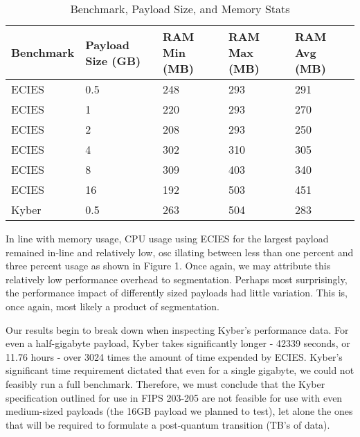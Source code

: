 \documentclass[a4paper]{article}
\begin{document}
  \begin{table}[htbp]
      \centering
      \caption{Benchmark, Payload Size, and Memory Stats}
      \label{tab:benchmark-payload-memory}
      \begin{tabular}{@{}lllll@{}}
          \toprule
          Benchmark & Payload Size (GB) & RAM Min (MB) & RAM Max (MB) & RAM Avg (MB) \\ \midrule
          ECIES     & 0.5               & 248           & 293           & 291           \\
          ECIES     & 1                 & 220           & 293           & 270           \\
          ECIES     & 2                 & 208           & 293           & 250           \\
          ECIES     & 4                 & 302           & 310           & 305           \\
          ECIES     & 8                 & 309           & 403           & 340           \\
          ECIES     & 16                & 192           & 503           & 451           \\
          Kyber     & 0.5               & 263           & 504           & 283           \\ \bottomrule
      \end{tabular}
  \end{table}

In line with memory usage, CPU usage using ECIES for the largest payload
remained in-line and relatively low, osc illating between less than one
percent and three percent usage as shown in Figure 1. Once again, we may
attribute this relatively low performance overhead to segmentation.
Perhaps most surprisingly, the performance impact of differently sized
payloads had little variation. This is, once again, most likely a
product of segmentation.

Our results begin to break down when inspecting Kyber's performance
data. For even a half-gigabyte payload, Kyber takes significantly longer
- 42339 seconds, or 11.76 hours - over 3024 times the amount of time
expended by ECIES. Kyber's significant time requirement dictated that
even for a single gigabyte, we could not feasibly run a full benchmark.
Therefore, we must conclude that the Kyber specification outlined for
use in FIPS 203-205 are not feasible for use with even medium-sized
payloads (the 16GB payload we planned to test), let alone the ones that
will be required to formulate a post-quantum transition (TB's of data).
\end{document}
